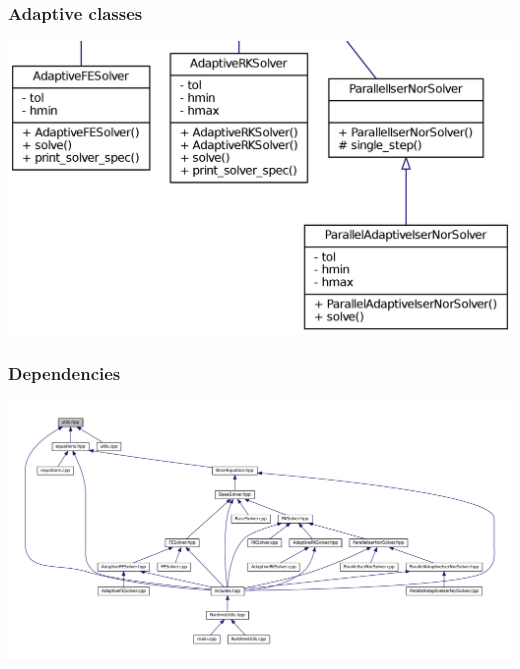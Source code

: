 \documentclass{beamer}
\begin{document}
\begin{frame} %
	\frametitle{Adaptive classes}
	\centering
	\includegraphics[width=\linewidth]{etc/classes_adaptive.jpg}
\end{frame}


\begin{frame} %
	\frametitle{Dependencies}
	\centering
	\includegraphics[width=\textwidth]{etc/headers.pdf}
\end{frame}
\end{document}
